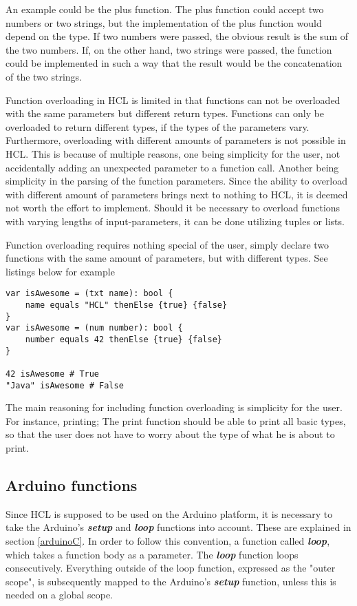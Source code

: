 An example could be the plus function. 
The plus function could accept two numbers or two strings, but the implementation of the plus function would depend on the type.
If two numbers were passed, the obvious result is the sum of the two numbers.
If, on the other hand, two strings were passed, the function could be implemented in such a way that the result would be the concatenation of the two strings.

Function overloading in HCL is limited in that functions can not be overloaded with the same parameters but different return types. 
Functions can only be overloaded to return different types, if the types of the parameters vary.
Furthermore, overloading with different amounts of parameters is not possible in HCL.
This is because of multiple reasons, one being simplicity for the user, not accidentally adding an unexpected parameter to a function call. 
Another being simplicity in the parsing of the function parameters. 
Since the ability to overload with different amount of parameters brings next to nothing to HCL, it is deemed not worth the effort to implement.
Should it be necessary to overload functions with varying lengths of input-parameters, it can be done utilizing tuples or lists.

Function overloading requires nothing special of the user, simply declare two functions with the same amount of parameters, but with different types. 
See listings below for example

\begin{lstlisting}[language=HCL,label=lis:hclTypeDcls,firstnumber=1]
var isAwesome = (txt name): bool {
	name equals "HCL" thenElse {true} {false}
}
var isAwesome = (num number): bool {
	number equals 42 thenElse {true} {false}
}

42 isAwesome # True
"Java" isAwesome # False
\end{lstlisting}

The main reasoning for including function overloading is simplicity for the user.
For instance, printing; 
The print function should be able to print all basic types, so that the user does not have to worry about the type of what he is about to print.

\subsection{Arduino functions}
Since HCL is supposed to be used on the Arduino platform, it is necessary to take the Arduino's \textbf{\textit{setup}} and \textbf{\textit{loop}} functions into account. 
These are explained in section \ref{arduinoC}.
In order to follow this convention, a function called \textbf{\textit{loop}}, which takes a function body as a parameter.
The \textbf{\textit{loop}} function loops consecutively.
Everything outside of the loop function, expressed as the "outer scope", is subsequently mapped to the Arduino's \textbf{\textit{setup}} function, unless this is needed on a global scope. 

